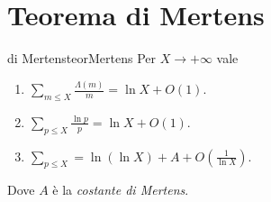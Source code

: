 \section{Teorema di Mertens}

\begin{teor}{di Mertens}{teorMertens}
	Per \(X\to +\infty\) vale
	\begin{enumerate}
		\item \(\displaystyle \sum_{m\le X} \frac{\Lambda(m)}{m} = \ln X + O(1)\).
		\item \(\displaystyle \sum_{p\le X} \frac{\ln p}{p} = \ln X + O(1)\).
		\item \(\displaystyle \sum_{p\le X} = \ln (\ln X) + A + O \left( \frac{1}{\ln X} \right)\).
	\end{enumerate}
	Dove \(A\) è la \emph{costante di Mertens}.
\end{teor}
